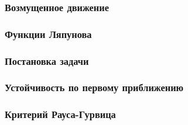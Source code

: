 \subsubsection*{Возмущенное движение}

\subsubsection*{Функции Ляпунова}


\subsubsection*{Постановка задачи}

\subsubsection*{Устойчивость по первому приближению}

\subsubsection*{Критерий Рауса-Гурвица}
